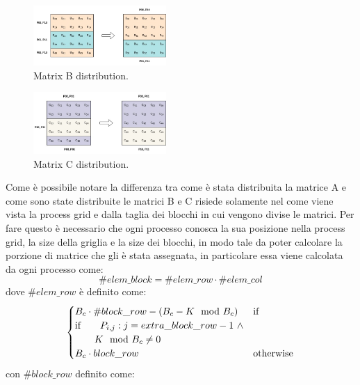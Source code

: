 \documentclass[conference]{IEEEtran}
\begin{document}
\begin{figure}[H]
    \raggedright
    \includegraphics[width=0.45\textwidth]{resources/matrixB_row_block_cyclic_distribution.jpg}
    \caption{Matrix B distribution.}
    \label{fig:matrix_b_distribution}
\end{figure}
\begin{figure}[H]
    \raggedright
    \includegraphics[width=0.45\textwidth]{resources/matrixC_row_block_cyclic_distribution.jpg}
    \caption{Matrix C distribution.}
    \label{fig:matrix_c_distribution}
\end{figure}
Come è possibile notare la differenza tra come è stata distribuita la matrice A e come sono state distribuite le matrici B e C risiede solamente nel come viene vista la process grid e dalla taglia dei blocchi in cui vengono divise le matrici.
Per fare questo è necessario che ogni processo conosca la sua posizione nella process grid, la size della griglia e la size dei blocchi, in modo tale da poter calcolare la porzione di matrice che gli è stata assegnata, in particolare essa viene calcolata da ogni processo come:
\begin{equation}
    \#elem\_block=\#elem\_row\cdot \#elem\_col
\end{equation}
dove $\#elem\_row$ è definito come:
\begin{equation}
    \begin{cases}
        B_c\cdot \#block\_row-(B_c-K \mod B_c) &  \text{if}\ \\
        \text{if}\text{\quad}\text{\quad} P_{i,j} : j=extra\_block\_row-1 \ \land \\ 
        \text{\quad} \text{\quad}K \mod B_c \neq 0\\
        B_c\cdot block\_row & \text{otherwise}\\
    \end{cases} 
\end{equation}
con $\#block\_row$ definito come:
\end{document}
